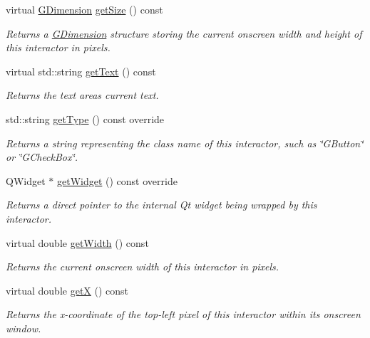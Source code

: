 \begin{DoxyCompactItemize}
virtual \mbox{\hyperlink{structsgl_1_1GDimension}{G\+Dimension}} \mbox{\hyperlink{classsgl_1_1GInteractor_a7b4eec96a2bdc6420695d5796a78eea9}{get\+Size}} () const
\begin{DoxyCompactList}\small\item\em Returns a \mbox{\hyperlink{structsgl_1_1GDimension}{G\+Dimension}} structure storing the current onscreen width and height of this interactor in pixels. \end{DoxyCompactList}\item 
virtual std\+::string \mbox{\hyperlink{classsgl_1_1GTextArea_aff553c50924b836c29f146ed34a7c6ec}{get\+Text}} () const
\begin{DoxyCompactList}\small\item\em Returns the text area\textquotesingle{}s current text. \end{DoxyCompactList}\item 
std\+::string \mbox{\hyperlink{classsgl_1_1GTextArea_a9b72ede4ee8520f987a0c01e30654814}{get\+Type}} () const override
\begin{DoxyCompactList}\small\item\em Returns a string representing the class name of this interactor, such as \char`\"{}\+G\+Button\char`\"{} or \char`\"{}\+G\+Check\+Box\char`\"{}. \end{DoxyCompactList}\item 
Q\+Widget $\ast$ \mbox{\hyperlink{classsgl_1_1GTextArea_a3b33a602b31a6b809d020535a59db3b4}{get\+Widget}} () const override
\begin{DoxyCompactList}\small\item\em Returns a direct pointer to the internal Qt widget being wrapped by this interactor. \end{DoxyCompactList}\item 
virtual double \mbox{\hyperlink{classsgl_1_1GInteractor_a0ed2965abd4f5701d2cadf71239faf19}{get\+Width}} () const
\begin{DoxyCompactList}\small\item\em Returns the current onscreen width of this interactor in pixels. \end{DoxyCompactList}\item 
virtual double \mbox{\hyperlink{classsgl_1_1GInteractor_a344385751bee0720059403940d57a13e}{getX}} () const
\begin{DoxyCompactList}\small\item\em Returns the x-\/coordinate of the top-\/left pixel of this interactor within its onscreen window. \end{DoxyCompactList}\item 

\end{DoxyCompactItemize}
